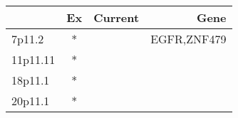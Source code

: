 \begin{tabular}{lccr}
\toprule
{} & Ex & Current &         Gene \\
\midrule
7p11.2   &  * &         &  EGFR,ZNF479 \\
11p11.11 &  * &         &              \\
18p11.1  &  * &         &              \\
20p11.1  &  * &         &              \\
\bottomrule
\end{tabular}
